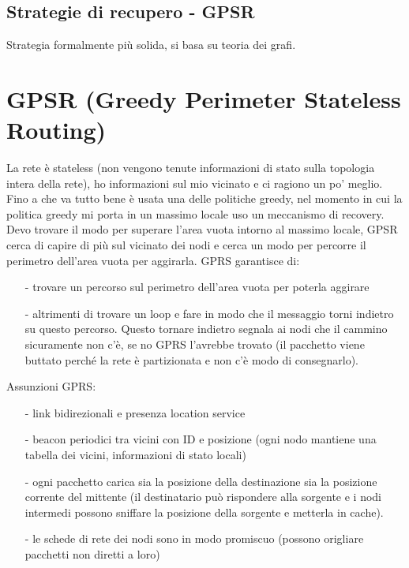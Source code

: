 \documentclass[12pt,italian]{report}
\begin{document}
\subsection{Strategie di recupero - GPSR}
Strategia formalmente più solida, si basa su teoria dei grafi. 

\section{GPSR (Greedy Perimeter Stateless Routing)}
La rete è stateless (non vengono tenute informazioni di stato sulla topologia intera della rete), ho informazioni sul mio vicinato e ci ragiono un po' meglio. \\ Fino a che va tutto bene è usata una delle politiche greedy, nel momento in cui la politica greedy mi porta in un massimo locale uso un meccanismo di recovery. \\ Devo trovare il modo per superare l'area vuota intorno al massimo locale, GPSR cerca di capire di più sul vicinato dei nodi e cerca un modo per percorre il perimetro dell'area vuota per aggirarla. 
\bigbreak
\noindent GPRS garantisce di: 
\begin{itemize}
    \item [-] trovare un percorso sul perimetro dell'area vuota per poterla aggirare
    \item [-] altrimenti di trovare un loop e fare in modo che il messaggio torni indietro su questo percorso. Questo tornare indietro segnala ai nodi che il cammino sicuramente non c'è, se no GPRS l'avrebbe trovato (il pacchetto viene buttato perché la rete è partizionata e non c'è modo di consegnarlo). 
\end{itemize}
\noindent Assunzioni GPRS:
\begin{itemize}
    \item [-] link bidirezionali e presenza location service
    \item [-] beacon periodici tra vicini con ID e posizione (ogni nodo mantiene una tabella dei vicini, informazioni di stato locali)
    \item [-] ogni pacchetto carica sia la posizione della destinazione sia la posizione corrente del mittente (il destinatario può rispondere alla sorgente e i nodi intermedi possono sniffare la posizione della sorgente e metterla in cache). 
    \item [-] le schede di rete dei nodi sono in modo promiscuo (possono origliare pacchetti non diretti a loro)
 \end{itemize}
 
\end{document}

